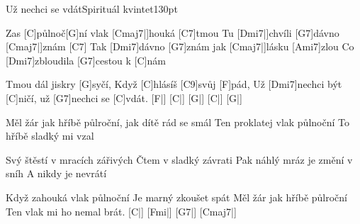 \begin{song}{Už nechci se vdát}{Spirituál kvintet}{130pt}

%
Zas [C]půlnoč[G]ní vlak [Cmaj7|]{houká} [C7]tmou
Tu [Dmi7|]{chvíli} [G7]dávno [Cmaj7|]{znám} [C7]{}
Tak [Dmi7]dávno [G7]znám jak [Cmaj7|]{lásku} [Ami7]zlou
Co [Dmi7]zbloudila [G7]cestou k [C]nám

\chorus%
Tmou dál jiskry [G]syčí,
Když [C]hlásíš [C9]svůj [F]pád,
Už [Dmi7]nechci být [C]ničí,
už [G7]nechci se [C]vdát. [F|]{} [C|]{} [G|]{} [C|]{} [G|]{}

%
Měl žár jak hříbě půlroční,
jak dítě rád se smál
Ten proklatej vlak půlnoční
To hříbě sladký mi vzal
\repchor

%
Svý štěstí v mracích zářivých
Čtem v sladký závrati
Pak náhlý mráz je změní v sníh
A nikdy je nevrátí
\repchor

%
Když zahouká vlak půlnoční
Je marný zkoušet spát
Měl žár jak hříbě půlroční
Ten vlak mi ho nemal brát.
[C|]{} [Fmi|]{} [G7|]{} [Cmaj7|]{}
\end{song}

